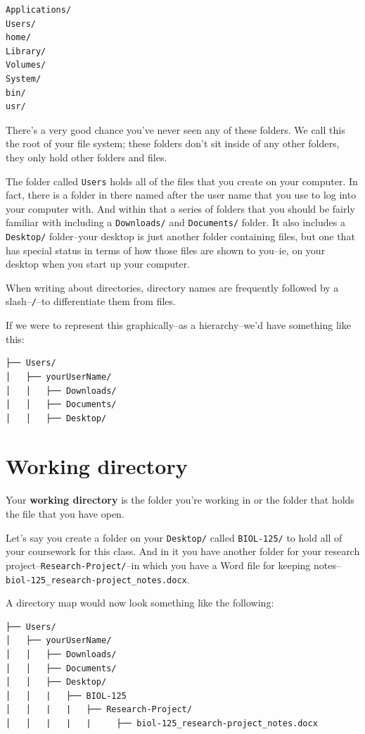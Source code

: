 \documentclass[
]{book}
\begin{document}
\begin{verbatim}
Applications/
Users/
home/
Library/
Volumes/
System/
bin/
usr/
\end{verbatim}

There's a very good chance you've never seen any of these folders. We call this the root of your file system; these folders don't sit inside of any other folders, they only hold other folders and files.

The folder called \texttt{Users} holds all of the files that you create on your computer. In fact, there is a folder in there named after the user name that you use to log into your computer with. And within that a series of folders that you should be fairly familiar with including a \texttt{Downloads/} and \texttt{Documents/} folder. It also includes a \texttt{Desktop/} folder--your desktop is just another folder containing files, but one that has special status in terms of how those files are shown to you--ie, on your desktop when you start up your computer.

When writing about directories, directory names are frequently followed by a slash--\texttt{/}--to differentiate them from files.

If we were to represent this graphically--as a hierarchy--we'd have something like this:

\begin{verbatim}
├── Users/
│   ├── yourUserName/
│   │   ├── Downloads/
│   │   ├── Documents/
│   │   ├── Desktop/
\end{verbatim}

\section{Working directory}\label{working-directory}

Your \textbf{working directory} is the folder you're working in or the folder that holds the file that you have open.

Let's say you create a folder on your \texttt{Desktop/} called \texttt{BIOL-125/} to hold all of your coursework for this class. And in it you have another folder for your research project--\texttt{Research-Project/}--in which you have a Word file for keeping notes--\texttt{biol-125\_research-project\_notes.docx}.

A directory map would now look something like the following:

\begin{verbatim}
├── Users/
│   ├── yourUserName/
│   │   ├── Downloads/
│   │   ├── Documents/
│   │   ├── Desktop/
│   │   |   ├── BIOL-125
│   │   |   |   ├── Research-Project/
│   │   |   |   |     ├── biol-125_research-project_notes.docx
\end{verbatim}
\end{document}
